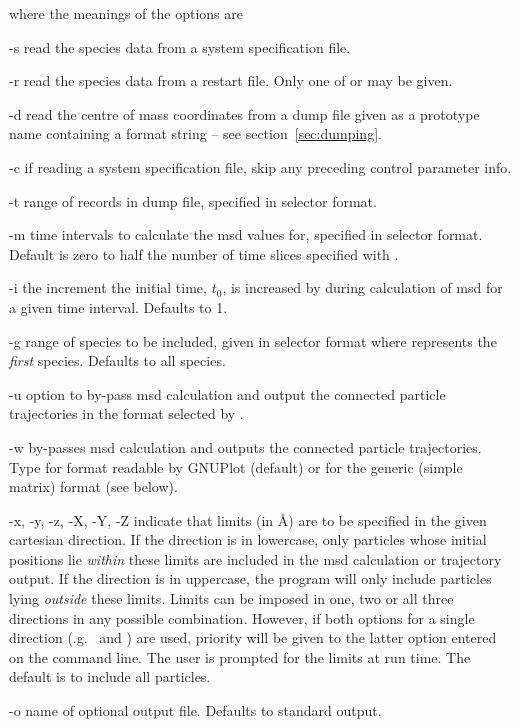 \documentclass[a4paper,twoside]{report}
\begin{document}
where the meanings of the options are
\begin{Argdescription}
\item[-s] read the species data from a system specification file.
\item[-r] read the species data from a restart file. Only one of
   or  may be given.
\item[-d] read the centre of mass coordinates from a dump file given as a
prototype name containing a  format string -- see
section~\ref{sec:dumping}. 
\item[-c] if reading a system specification file, skip any preceding control 
parameter info.
\item[-t] range of records in dump file, specified in selector format.
\item[-m] time intervals to calculate the msd values for, specified in
  selector format. Default is zero to half the number of time slices specified with .
\item[-i] the increment the initial time, $t_0$, is increased by during
calculation of msd for a given time interval. Defaults to 1.
\item[-g] range of species to be included, given in selector
  format where  represents the \emph{first} species. Defaults
  to all species. 
\item[-u] option to by-pass msd calculation and output the connected particle
trajectories in the format selected by . 
\item[-w] by-passes msd calculation and outputs the connected particle trajectories.
Type  for format readable by GNUPlot (default) or  for the generic (simple matrix) format 
(see below). 
\item[-x, -y, -z, -X, -Y, -Z] indicate that limits (in {\AA}) are to be
  specified in the given cartesian direction. If the direction is in
  lowercase, only particles whose initial positions lie \emph{within}
  these limits are included in the msd calculation or trajectory
  output. If the direction is in uppercase, the program will only
  include particles lying \emph{outside} these limits. Limits can be
  imposed in one, two or all three directions in any possible
  combination. However, if both options for a single direction (\e.g.\
   and ) are used, priority will be given to the
  latter option entered on the command line. The user is prompted for
  the limits at run time. The default is to include all particles.
\item[-o] name of optional output file. Defaults to standard output.
\end{Argdescription}
\end{document}
